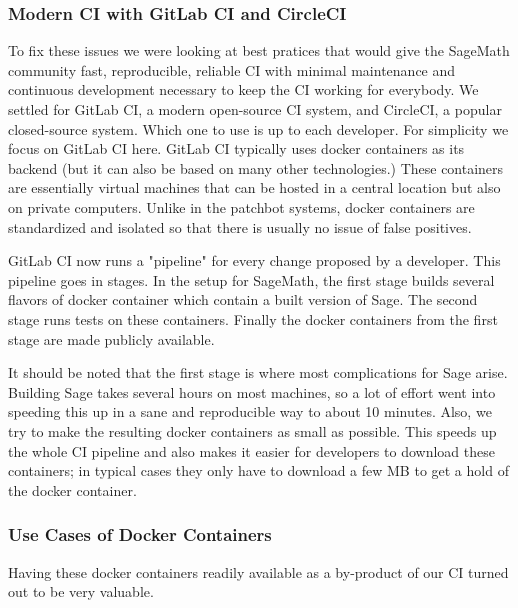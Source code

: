 \documentclass{deliverablereport}
\begin{document}
\subsubsection{Modern CI with GitLab CI and CircleCI}
To fix these issues we were looking at best pratices that would give the
SageMath community fast, reproducible, reliable CI with minimal maintenance and
continuous development necessary to keep the CI working for everybody.  We
settled for GitLab CI, a modern open-source CI system, and CircleCI, a popular
closed-source system. Which one to use is up to each developer. For simplicity
we focus on GitLab CI here. GitLab CI typically uses docker containers as its
backend (but it can also be based on many other technologies.) These containers
are essentially virtual machines that can be hosted in a central location but
also on private computers. Unlike in the patchbot systems, docker containers
are standardized and isolated so that there is usually no issue of false
positives. %

GitLab CI now runs a "pipeline" for every change proposed by a developer.
This pipeline goes in stages. In the setup for SageMath, the first stage builds
several flavors of docker container which contain a built version of Sage. The
second stage runs tests on these containers. Finally the docker containers from
the first stage are made publicly available.

It should be noted that the first stage is where most complications for Sage
arise. Building Sage takes several hours on most machines, so a lot of effort
went into speeding this up in a sane and reproducible way to about 10 minutes.
Also, we try to make the resulting docker containers as small as possible. This
speeds up the whole CI pipeline and also makes it easier for developers to
download these containers; in typical cases they only have to download a few MB
to get a hold of the docker container.

\subsubsection{Use Cases of Docker Containers}
Having these docker containers readily available as a by-product of our CI turned out to be very valuable.
\end{document}
